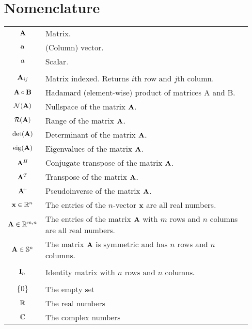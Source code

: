 \chapter{Nomenclature}

\begin{tabular}{cl}
$\mathbf{A}$                   & Matrix.                                                   \\
$\mathbf{a}$                   & (Column) vector.                                          \\
$a$                     & Scalar.                                                   \\
& \\
$\mathbf{A}_{ij}$              & Matrix indexed. Returns $i$th row and $j$th column.       \\
$\mathbf{A}\circ \mathbf{B}$          & Hadamard (element-wise) product of matrices A and B.      \\
$\mathcal{N}(\mathbf{A})$              & Nullspace of the matrix $\mathbf{A}$.                            \\
$\mathcal{R}(\mathbf{A})$           & Range of the matrix $\mathbf{A}$.                                \\
$\det(\mathbf{A})$             & Determinant of the matrix $\mathbf{A}$.                          \\
$\operatorname{eig}(\mathbf{A})$             & Eigenvalues of the matrix $\mathbf{A}$.                          \\
$\mathbf{A}^H$                 & Conjugate transpose of the matrix $\mathbf{A}$.                  \\
$\mathbf{A}^T$                 & Transpose of the matrix $\mathbf{A}$.                            \\
$\mathbf{A}\!^+$              & Pseudoinverse of the matrix $\mathbf{A}$.                        \\
$\mathbf{x}\in\mathbb{R}^{n}$            & The entries of the $n$-vector $\mathbf{x}$ are all real numbers. \\
$\mathbf{A}\in\mathbb{R}^{m,n}$           & The entries of the matrix $\mathbf{A}$ with $m$ rows and $n$ columns are all real numbers. \\
$\mathbf{A}\in\mathbb{S}^{n}$            & The matrix $\mathbf{A}$ is symmetric and has $n$ rows and $n$ columns. \\
& \\
$\mathbf{I}_n$                 & Identity matrix with $n$ rows and $n$ columns.            \\
& \\
$\{0\}$                 & The empty set       \\
$\mathbb{R}$                   & The real numbers    \\
$\mathbb{C}$                   & The complex numbers
\end{tabular}